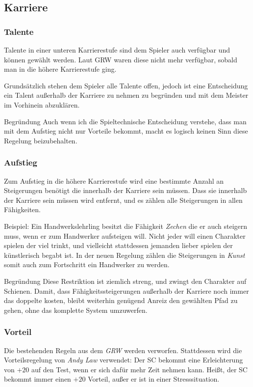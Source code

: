 \documentclass[a4paper]{article}
\begin{document}
\begin{multicols}{2}
\subsection{Karriere}
\subsubsection{Talente}
Talente in einer unteren Karrierestufe sind dem Spieler auch verfügbar und können gewählt werden. 
Laut GRW waren diese nicht mehr verfügbar, sobald man in die höhere Karrierestufe ging.

Grundsätzlich stehen dem Spieler alle Talente offen, jedoch ist eine Entscheidung ein Talent außerhalb der Karriere zu nehmen zu begründen und mit dem Meister im Vorhinein abzuklären.

\begin{DndComment}{Begründung}
  Auch wenn ich die Spieltechnische Entscheidung verstehe, dass man mit dem Aufstieg nicht nur Vorteile bekommt, macht es logisch keinen Sinn diese Regelung beizubehalten.
\end{DndComment}

\subsubsection{Aufstieg}
Zum Aufstieg in die höhere Karrierestufe wird eine bestimmte Anzahl an Steigerungen benötigt die innerhalb der Karriere sein müssen.
Dass sie innerhalb der Karriere sein müssen wird entfernt, und es zählen alle Steigerungen in allen Fähigkeiten.

Beispiel: Ein Handwerkslehrling besitzt die Fähigkeit \textit{Zechen} die er auch steigern muss, wenn er zum Handwerker aufsteigen will. Nicht jeder will einen Charakter spielen der viel trinkt, und vielleicht stattdessen jemanden lieber spielen der künstlerisch begabt ist. In der neuen Regelung zählen die Steigerungen in \textit{Kunst} somit auch zum Fortschritt ein Handwerker zu werden.

\begin{DndComment}{Begründung}
  Diese Restriktion ist ziemlich streng, und zwingt den Charakter auf Schienen. Damit, dass Fähigkeitssteigerungen außerhalb der Karriere noch immer das doppelte kosten, bleibt weiterhin genügend Anreiz den gewählten Pfad zu gehen, ohne das komplette System umzuwerfen.
\end{DndComment}

\subsubsection{Vorteil}
Die bestehenden Regeln aus dem \textit{GRW} werden verworfen.
Stattdessen wird die Vorteilsregelung von \textit{Andy Law} verwendet: Der SC bekommt eine Erleichterung von $+20$ auf den Test, wenn er sich dafür mehr Zeit nehmen kann. Heißt, der SC bekommt immer einen $+20$ Vorteil, außer er ist in einer Stresssituation.


\end{multicols}
\end{document}
